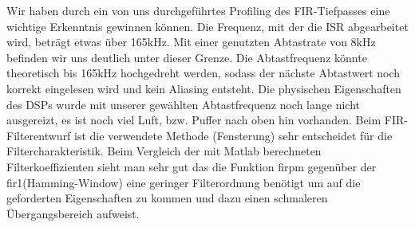 \noindent Wir haben durch ein von uns durchgeführtes Profiling des FIR-Tiefpasses eine wichtige Erkenntnis gewinnen können. Die Frequenz, mit der die ISR abgearbeitet wird, beträgt etwas über 165kHz. Mit einer genutzten Abtastrate von 8kHz befinden wir uns deutlich unter dieser Grenze. Die Abtastfrequenz könnte theoretisch bis 165kHz hochgedreht werden, sodass der nächste Abtastwert noch korrekt eingelesen wird und kein Aliasing entsteht. Die physischen Eigenschaften des DSPs wurde mit unserer gewählten Abtastfrequenz noch lange nicht ausgereizt, es ist noch viel Luft, bzw. Puffer nach oben hin vorhanden. Beim FIR-Filterentwurf ist die verwendete Methode (Fensterung) sehr entscheidet für die Filtercharakteristik. Beim Vergleich der mit Matlab berechneten Filterkoeffizienten sieht man sehr gut das die Funktion firpm gegenüber der fir1(Hamming-Window) eine geringer Filterordnung benötigt um auf die geforderten Eigenschaften zu kommen und dazu einen schmaleren Übergangsbereich aufweist.